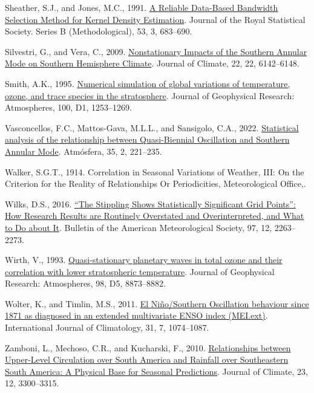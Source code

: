 \documentclass[12pt,oneside]{reedthesis}
\newlength{\cslhangindent}
\newenvironment{CSLReferences}[2] %
 {%
  \setlength{\parindent}{0pt}
  \ifodd #1 \everypar{\setlength{\hangindent}{\cslhangindent}}\ignorespaces\fi
  \ifnum #2 > 0
  \setlength{\parskip}{#2\baselineskip}
  \fi
 }%
 {}
\begin{document}
\begin{CSLReferences}{1}{0}
\leavevmode{}%
Sheather, S.J., and Jones, M.C., 1991. \href{https://www.jstor.org/stable/2345597}{A {Reliable Data-Based Bandwidth Selection Method} for {Kernel Density Estimation}}. Journal of the Royal Statistical Society. Series B (Methodological), 53, 3, 683--690.

\leavevmode{}%
Silvestri, G., and Vera, C., 2009. \href{https://doi.org/10.1175/2009JCLI3036.1}{Nonstationary {Impacts} of the {Southern Annular Mode} on {Southern Hemisphere Climate}}. Journal of Climate, 22, 22, 6142--6148.

\leavevmode{}%
Smith, A.K., 1995. \href{https://doi.org/10.1029/94JD02395}{Numerical simulation of global variations of temperature, ozone, and trace species in the stratosphere}. Journal of Geophysical Research: Atmospheres, 100, D1, 1253--1269.

\leavevmode{}%
Vasconcellos, F.C., Mattos-Gava, M.L.L., and Sansigolo, C.A., 2022. \href{https://doi.org/10.20937/ATM.52910}{Statistical analysis of the relationship between {Quasi-Biennial Oscillation} and {Southern Annular Mode}}. Atmósfera, 35, 2, 221--235.

\leavevmode{}%
Walker, S.G.T., 1914. Correlation in {Seasonal Variations} of {Weather}, {III}: {On} the {Criterion} for the {Reality} of {Relationships Or Periodicities}, {Meteorological Office},.

\leavevmode{}%
Wilks, D.S., 2016. \href{https://doi.org/10.1175/BAMS-D-15-00267.1}{{``{The Stippling Shows Statistically Significant Grid Points}''}: {How Research Results} are {Routinely Overstated} and {Overinterpreted}, and {What} to {Do} about {It}}. Bulletin of the American Meteorological Society, 97, 12, 2263--2273.

\leavevmode{}%
Wirth, V., 1993. \href{https://doi.org/10.1029/92JD02820}{Quasi-stationary planetary waves in total ozone and their correlation with lower stratospheric temperature}. Journal of Geophysical Research: Atmospheres, 98, D5, 8873--8882.

\leavevmode{}%
Wolter, K., and Timlin, M.S., 2011. \href{https://doi.org/10.1002/joc.2336}{El {Niño}/{Southern Oscillation} behaviour since 1871 as diagnosed in an extended multivariate {ENSO} index ({MEI}.ext)}. International Journal of Climatology, 31, 7, 1074--1087.

\leavevmode{}%
Zamboni, L., Mechoso, C.R., and Kucharski, F., 2010. \href{https://doi.org/10.1175/2009JCLI3129.1}{Relationships between {Upper-Level Circulation} over {South America} and {Rainfall} over {Southeastern South America}: {A Physical Base} for {Seasonal Predictions}}. Journal of Climate, 23, 12, 3300--3315.

\end{CSLReferences}


\end{document}
